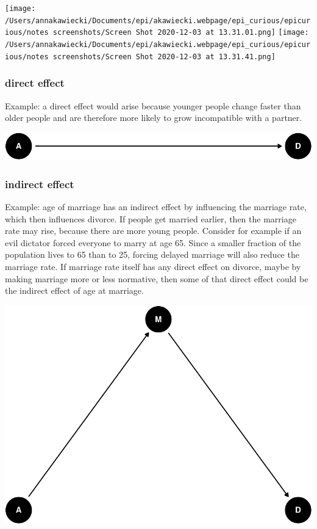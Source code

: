 \documentclass[
]{article}
\begin{document}
\texttt{[image: /Users/annakawiecki/Documents/epi/akawiecki.webpage/epi\_curious/epicurious/notes screenshots/Screen Shot 2020-12-03 at 13.31.01.png]}
\texttt{[image: /Users/annakawiecki/Documents/epi/akawiecki.webpage/epi\_curious/epicurious/notes screenshots/Screen Shot 2020-12-03 at 13.31.41.png]}

\hypertarget{direct-effect}{%
\subsubsection{direct effect}\label{direct-effect}}

Example: a direct effect would arise because younger people change
faster than older people and are therefore more likely to grow
incompatible with a partner.

\includegraphics{index_files/figure-latex/direct-1.pdf}

\hypertarget{indirect-effect}{%
\subsubsection{indirect effect}\label{indirect-effect}}

Example: age of marriage has an indirect effect by influencing the
marriage rate, which then influences divorce. If people get married
earlier, then the marriage rate may rise, because there are more young
people. Consider for example if an evil dictator forced everyone to
marry at age 65. Since a smaller fraction of the population lives to 65
than to 25, forcing delayed marriage will also reduce the marriage rate.
If marriage rate itself has any direct effect on divorce, maybe by
making marriage more or less normative, then some of that direct effect
could be the indirect effect of age at marriage.

\includegraphics{index_files/figure-latex/indirect-1.pdf}
\end{document}
